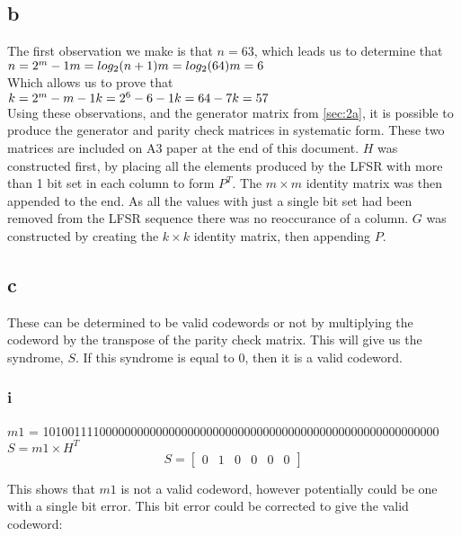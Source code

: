 \subsection{b}
The first observation we make is that $n = 63$, which leads us to determine that \\ $ n = 2^{m}-1 \\ m = log_{2}(n+1) \\ m = log_{2}(64) \\ m = 6$ \\
Which allows us to prove that \\ $k = 2^{m} - m - 1 \\ k = 2^{6} - 6 - 1 \\ k = 64 - 7 \\ k = 57$ \\
Using these observations, and the generator matrix from \ref{sec:2a}, it is possible to produce the generator and parity check matrices in systematic form.
These two matrices are included on A3 paper at the end of this document.
$H$ was constructed first, by placing all the elements produced by the LFSR with more than 1 bit set in each column to form $P^{T}$.
The $m \times m$ identity matrix was then appended to the end.
As all the values with just a single bit set had been removed from the LFSR sequence there was no reoccurance of a column.
$G$ was constructed by creating the $k \times k$ identity matrix, then appending $P$.

\subsection{c}
These can be determined to be valid codewords or not by multiplying the codeword by the transpose of the parity check matrix.
This will give us the syndrome, $S$.
If this syndrome is equal to 0, then it is a valid codeword.

\subsubsection{i}
$m1$ = 101001111000000000000000000000000000000000000000000000000000000	\\

$S = m1 \times H^{T}$ \\
\[ S = \left[ \begin{array}{cccccc} 0 & 1 & 0 & 0 & 0 & 0 \end{array} \right] \]

This shows that $m1$ is not a valid codeword, however potentially could be one with a single bit error.
This bit error could be corrected to give the valid codeword:

